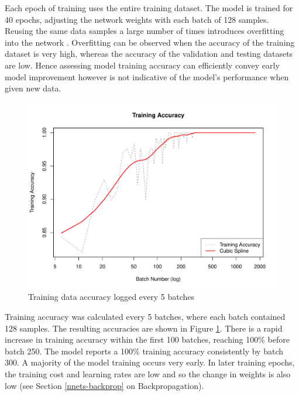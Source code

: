 Each epoch of training uses the entire training dataset. The model is trained for 40 epochs, adjusting the network weights with each batch of 128 samples. Reusing the same data samples a large number of times introduces overfitting into the network \cite{Goodfellow-et-al-2016}. Overfitting can be observed when the accuracy of the training dataset is very high, whereas the accuracy of the validation and testing datasets are low. Hence assessing model training accuracy can efficiently convey early model improvement however is not indicative of the model's performance when given new data.

\begin{figure}[ht]
	\centering
	\includegraphics[width=\textwidth]{Images/7_train_acc4.pdf}
	\caption{Training data accuracy logged every 5 batches}
	\label{results-train-acc4-fig}
\end{figure}

Training accuracy was calculated every 5 batches, where each batch contained 128 samples. The resulting accuracies are shown in Figure \ref{results-train-acc4-fig}. There is a rapid increase in training accuracy within the first 100 batches, reaching 100\% before batch 250. The model reports a 100\% training accuracy consistently by batch 300. A majority of the model training occurs very early. In later training epochs, the training cost and learning rates are low and so the change in weights is also low (see Section \ref{nnets-backprop} on Backpropagation).


